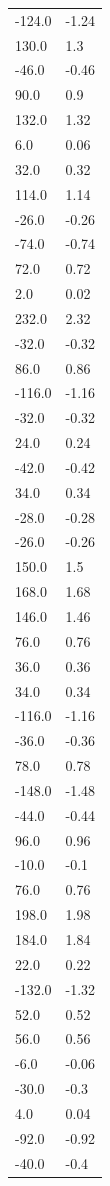 \begin{longtable}{ll}
-124.0 & -1.24 \\
130.0 & 1.3 \\
-46.0 & -0.46 \\
90.0 & 0.9 \\
132.0 & 1.32 \\
6.0 & 0.06 \\
32.0 & 0.32 \\
114.0 & 1.14 \\
-26.0 & -0.26 \\
-74.0 & -0.74 \\
72.0 & 0.72 \\
2.0 & 0.02 \\
232.0 & 2.32 \\
-32.0 & -0.32 \\
86.0 & 0.86 \\
-116.0 & -1.16 \\
-32.0 & -0.32 \\
24.0 & 0.24 \\
-42.0 & -0.42 \\
34.0 & 0.34 \\
-28.0 & -0.28 \\
-26.0 & -0.26 \\
150.0 & 1.5 \\
168.0 & 1.68 \\
146.0 & 1.46 \\
76.0 & 0.76 \\
36.0 & 0.36 \\
34.0 & 0.34 \\
-116.0 & -1.16 \\
-36.0 & -0.36 \\
78.0 & 0.78 \\
-148.0 & -1.48 \\
-44.0 & -0.44 \\
96.0 & 0.96 \\
-10.0 & -0.1 \\
76.0 & 0.76 \\
198.0 & 1.98 \\
184.0 & 1.84 \\
22.0 & 0.22 \\
-132.0 & -1.32 \\
52.0 & 0.52 \\
56.0 & 0.56 \\
-6.0 & -0.06 \\
-30.0 & -0.3 \\
4.0 & 0.04 \\
-92.0 & -0.92 \\
-40.0 & -0.4 \\

\end{longtable}
